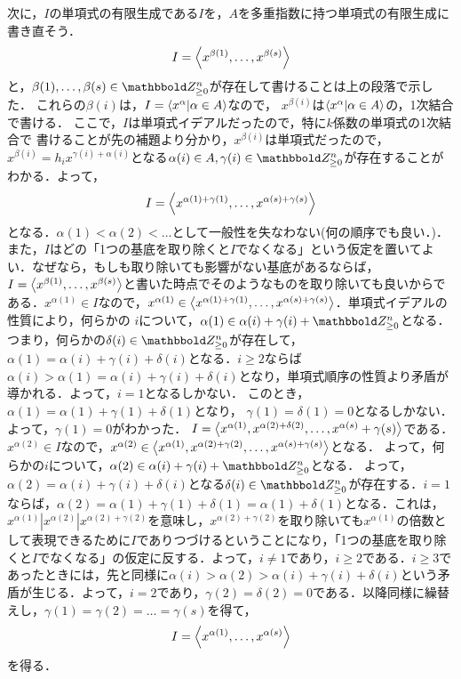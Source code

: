 \documentclass[9pt]{ltjsarticle}
\begin{document}
\begin{myproof}
次に，$I$の単項式の有限生成である$I$を，$A$を多重指数に持つ単項式の有限生成に書き直そう．
\begin{align}
 I=\left\langle x^{\beta(1)},\dots,x^{\beta(s)} \right\rangle
\end{align}
と，$\beta(1),\dots,\beta(s)\in \Zge^n$が存在して書けることは上の段落で示した．
これらの$\beta(i)$は，$I=\left\langle x^\alpha | \alpha \in A \right\rangle$なので，
$x^{\beta(i)}$は$\left\langle x^{\alpha}|\alpha \in A \right\rangle$の，1次結合で書ける．
ここで，$I$は単項式イデアルだったので，特に$k$係数の単項式の1次結合で
書けることが先の補題より分かり，$x^{\beta(i)}$は単項式だったので，
$x^{\beta(i)}=h_i x^{\gamma(i)+\alpha(i)}$となる$\alpha(i)\in A, \gamma(i)\in \Zge^n$が存在することがわかる．よって，
\begin{align}
 I=\left\langle x^{\alpha(1)+\gamma(1)},\dots,x^{\alpha(s)+\gamma(s)} \right\rangle
\end{align}
となる．$\alpha(1)< \alpha(2)< \dots$として一般性を失なわない(何の順序でも良い．)．また，$I$はどの「1つの基底を取り除くと$I$でなくなる」という仮定を置いてよい．なぜなら，もしも取り除いても影響がない基底があるならば，$I=\left\langle x^{\beta(1)},\dots,x^{\beta(s)} \right\rangle$と書いた時点でそのようなものを取り除いても良いからである．$x^{\alpha(1)}\in I$なので，$x^{\alpha(1)}\in \left\langle x^{\alpha(1)+\gamma(1)},\dots,x^{\alpha(s)+\gamma(s)} \right\rangle$．単項式イデアルの性質により，何らかの
$i$について，$\alpha(1) \in \alpha(i)+\gamma(i) + \Zge^n$となる．
 つまり，何らかの$\delta(i)\in \Zge^n$が存在して，
$\alpha(1)=\alpha(i)+\gamma(i)+\delta(i)$となる．$i\ge 2$ならば
$\alpha(i)>\alpha(1)=\alpha(i)+\gamma(i)+\delta(i)$となり，単項式順序の性質より矛盾が導かれる．よって，$i=1$となるしかない．
 このとき，$\alpha(1)=\alpha(1)+\gamma(1)+\delta(1)$となり，
$\gamma(1)=\delta(1)=0$となるしかない．よって，$\gamma(1)=0$がわかった．
$I=\left\langle x^{\alpha(1)},x^{\alpha(2)+\delta(2)},\dots,x^{\alpha(s)}+\gamma(s) \right\rangle$である．$x^{\alpha(2)}\in I$なので，$x^{\alpha(2)}\in \left\langle x^{\alpha(1)},x^{\alpha(2)+\gamma(2)},\dots,x^{\alpha(s)+\gamma(s)} \right\rangle$となる．
よって，何らかの$i$について，$\alpha(2)\in \alpha(i) + \gamma(i)+\Zge^n$となる．
よって，$\alpha(2)=\alpha(i)+\gamma(i)+\delta(i)$となる$\delta(i)\in \Zge^n$が存在する．$i=1$ならば，$\alpha(2)=\alpha(1)+\gamma(1)+\delta(1)=\alpha(1)+\delta(1)$となる．これは，$x^{\alpha(1)}|x^{\alpha(2)}|x^{\alpha(2)+\gamma(2)}$を意味し，$x^{\alpha(2)+\gamma(2)}$を取り除いても$x^{\alpha(1)}$の倍数として表現できるために$I$でありつづけるということになり，「1つの基底を取り除くと$I$でなくなる」の仮定に反する．よって，$i\neq 1$であり，$i\ge 2$である．$i\ge 3$であったときには，先と同様に$\alpha(i)>\alpha(2)>\alpha(i)+\gamma(i)+\delta(i)$という矛盾が生じる．よって，$i=2$であり，$\gamma(2)=\delta(2)=0$である．以降同様に繰替えし，$\gamma(1)=\gamma(2)=\dots = \gamma(s)$を得て，
\begin{align}
 I=\left\langle x^{\alpha(1)},\dots,x^{\alpha(s)} \right\rangle
\end{align}
を得る．
\end{myproof}
\end{document}
